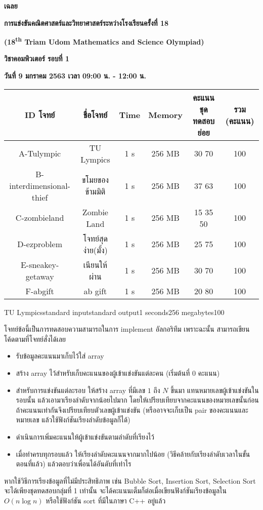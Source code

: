\documentclass[11pt,a4paper]{article}
\begin{document}
\vspace*{\fill}%
\noindent
\begin{center}
{\Large \textbf{เฉลย}}

{\Large \textbf{การแข่งขันคณิตศาสตร์และวิทยาศาสตร์ระหว่างโรงเรียนครั้งที่ 18}}

{\Large \textbf{(18\textsuperscript{th} Triam Udom Mathematics and Science Olympiad)}} 

{\Large\textbf{วิชาคอมพิวเตอร์ รอบที่ 1}}

{\Large\textbf{วันที่ 9 มกราคม 2563 เวลา 09:00 น. - 12:00 น.}}

\begin{tabular}{ |c|c|c|c|c|c|  }
  \hline
  \textbf{ID โจทย์} & ชื่อโจทย์ & Time & Memory & คะแนนชุดทดสอบย่อย & รวม (คะแนน)\\
  \hline
  A-Tulympic & TU Lympics & 1 s & 256 MB & 30 70 & 100\\
  B-interdimensional-thief & ขโมยของข้ามมิติ& 1 s & 256 MB & 37 63 & 100\\
  C-zombieland & Zombie Land & 1 s & 256 MB & 15 35 50 & 100\\
  D-ezproblem & โจทย์สุดง่าย(มั้ง) & 1 s & 256 MB & 25 75 & 100\\
  E-sneakey-getaway & เนียนให้ผ่าน & 1 s & 256 MB & 30 70 & 100\\
  F-abgift & ab gift & 1 s & 256 MB & 20 80 & 100\\
  \hline
\end{tabular}

\end{center}
\vfill
\pagebreak


\begin{problem}{TU Lympics}{standard input}{standard output}{1 seconds}{256 megabytes}{100}

โจทย์ข้อนี้เป็นการทดสอบความสามารถในการ implement อัลกอริทึม เพราะฉะนั้น สามารถเขียนโค้ดตามที่โจทย์สั่งได้เลย
\begin{itemize}
\item รับข้อมูลคะแนนมาเก็บไว้ใส่ array 
\item สร้าง array ไว้สำหรับเก็บคะแนนของผู้เข้าแข่งขันแต่ละคน (เริ่มต้นที่ $0$ คะแนน)
\item สำหรับการแข่งขันแต่ละรอบ ให้สร้าง array ที่มีเลข $1$ ถึง $N$ ขึ้นมา แทนหมายเลขผู้เข้าแข่งขันในรอบนั้น แล้วเอามาเรียงลำดับจากน้อยไปมาก โดยให้เปรียบเทียบจากคะแนนของหมายเลขนั้นก่อน ถ้าคะแนนเท่ากันจึงเปรียบเทียบตัวเลขผู้เข้าแข่งขัน (หรืออาจจะเก็บเป็น pair ของคะแนนและหมายเลข แล้วใช้ฟังก์ชันเรียงลำดับข้อมูลก็ได้)
\item ดำเนินการเพิ่มคะแนนให้ผู้เข้าแข่งขันตามลำดับที่เรียงไว้
\item เมื่อทำครบทุกรอบแล้ว ให้เรียงลำดับคะแนนจากมากไปน้อย (วิธีคล้ายกับเรียงลำดับเวลาในขั้นตอนที่แล้ว) แล้วตอบว่าเพื่อนได้อันดับที่เท่าไร
\end{itemize}

หากใช้วิธีการเรียงข้อมูลที่ไม่มีประสิทธิภาพ เช่น Bubble Sort, Insertion Sort, Selection Sort จะได้เพียงชุดทดสอบกลุ่มที่ 1 เท่านั้น จะได้คะแนนเต็มก็ต่อเมื่อเขียนฟังก์ชันเรียงข้อมูลใน $O(n \log n)$ หรือใช้ฟังก์ชัน sort ที่มีในภาษา C++ อยู่แล้ว

\end{problem}
\end{document}
